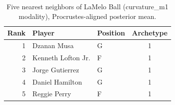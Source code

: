 \begin{table}[htbp]
  \centering\small
  \begin{tabular}{rllc}
    \toprule
    Rank & Player & Position & Archetype \\
    \midrule
    1 & Dzanan Musa & G & 1 \\
    2 & Kenneth Lofton Jr. & F & 1 \\
    3 & Jorge Gutierrez & G & 1 \\
    4 & Daniel Hamilton & G & 1 \\
    5 & Reggie Perry & F & 1 \\
    \bottomrule
  \end{tabular}
  \caption{Five nearest neighbors of LaMelo Ball (curvature_m1 modality), Procrustes-aligned posterior mean.}
  \label{tab:LaMelo_Ball_neighbors_curvature_m1}
\end{table}

